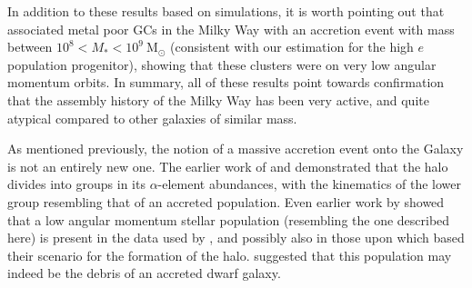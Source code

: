 In addition to these results based on simulations, it is worth
pointing out that \citet{2013MNRAS.436..122L} associated metal poor
GCs in the Milky Way with an accretion event with mass between $10^8
< M_* < 10^9\ \mathrm{M_\odot}$ (consistent with our estimation for
the high $e$ population progenitor), showing that these clusters
were on very low angular momentum orbits. In summary, all of these
results point towards confirmation that the assembly history of the
Milky Way has been very active, and quite atypical compared to other
galaxies of similar mass.

As mentioned previously, the notion of a massive accretion event
onto the Galaxy is not an entirely new one. The earlier
work of \citet{2010A&A...511L..10N} and \citet{2012A&A...538A..21S}
demonstrated that the halo divides into groups in its $\alpha$-element
abundances, with the kinematics of the lower \afe{} group resembling
that of an accreted population. Even earlier work by
\citet{2003ApJ...585L.125B} showed that a low angular momentum
 stellar population (resembling the one described here) is present in the data used by \citet{2000AJ....119.2843C}, and possibly also in those upon which \citet{1962ApJ...136..748E}
based their scenario for the formation of the halo.
\citet{2003ApJ...585L.125B} suggested that this population may
indeed be the debris of an accreted dwarf galaxy.  

